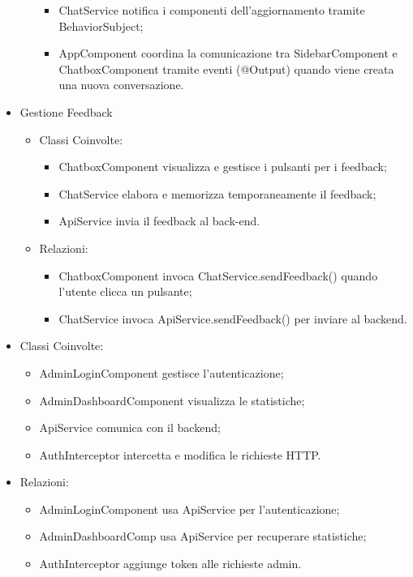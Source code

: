\begin{itemize}
\begin{itemize}
\begin{itemize}
            \item ChatService notifica i componenti dell’aggiornamento tramite BehaviorSubject;
            \item AppComponent coordina la comunicazione tra SidebarComponent e ChatboxComponent tramite eventi (@Output) quando viene creata una nuova conversazione.
        \end{itemize}
    \end{itemize}
    \item Gestione Feedback
    \begin{itemize}
        \item Classi Coinvolte:
        \begin{itemize}
            \item ChatboxComponent visualizza e gestisce i pulsanti per i feedback;
            \item ChatService elabora e memorizza temporaneamente il feedback;
            \item ApiService invia il feedback al back-end.
        \end{itemize}
        \item Relazioni:
        \begin{itemize}
            \item ChatboxComponent invoca ChatService.sendFeedback() quando l’utente clicca un pulsante;
            \item ChatService invoca ApiService.sendFeedback() per inviare al backend.
        \end{itemize}
    \end{itemize}
\end{itemize}
\begin{itemize}
    \item Classi Coinvolte:
    \begin{itemize}
        \item AdminLoginComponent gestisce l'autenticazione;
        \item AdminDashboardComponent visualizza le statistiche;
        \item ApiService comunica con il backend;
        \item AuthInterceptor intercetta e modifica le richieste HTTP.
    \end{itemize}
    \item Relazioni:
    \begin{itemize}
        \item AdminLoginComponent usa ApiService per l’autenticazione;
        \item AdminDashboardComp usa ApiService per recuperare statistiche;
        \item AuthInterceptor aggiunge token alle richieste admin.
    \end{itemize}
\end{itemize}
\newpage
